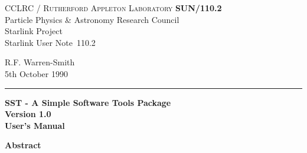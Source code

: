 \documentclass[twoside,11pt]{article}
\newcommand{\stardoccategory}  {Starlink User Note}
\newcommand{\stardocinitials}  {SUN}
\newcommand{\stardocnumber}    {110.2}
\newcommand{\stardocauthors}   {R.F. Warren-Smith}
\newcommand{\stardocdate}      {5th October 1990}
\newcommand{\stardoctitle}     {SST - A Simple Software Tools Package}
\newcommand{\stardocversion}   {Version 1.0}
\newcommand{\stardocmanual}    {User's Manual}
\newcommand{\stardocname}{\stardocinitials /\stardocnumber}
\newenvironment{latexonly}{}{}
\renewcommand{\_}{\texttt{\symbol{95}}}
\begin{document}
\thispagestyle{empty}

\begin{latexonly}
   CCLRC / \textsc{Rutherford Appleton Laboratory} \hfill \textbf{\stardocname}\\
   {\large Particle Physics \& Astronomy Research Council}\\
   {\large Starlink Project\\}
   {\large \stardoccategory\ \stardocnumber}
   \begin{flushright}
   \stardocauthors\\
   \stardocdate
   \end{flushright}
   \vspace{-4mm}
   \rule{\textwidth}{0.5mm}
   \vspace{5mm}
   \begin{center}
   {\Huge\textbf{\stardoctitle \\ [2.5ex]}}
   {\LARGE\textbf{\stardocversion \\ [4ex]}}
   {\Huge\textbf{\stardocmanual}}
   \end{center}
   \vspace{5mm}


   \vspace{10mm}
   \begin{center}
      {\Large\textbf{Abstract}}
   \end{center}
\end{latexonly}
\end{document}
